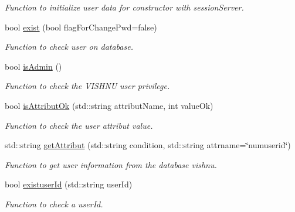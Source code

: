 \begin{DoxyCompactItemize}
\begin{DoxyCompactList}\small\item\em Function to initialize user data for constructor with sessionServer. \item\end{DoxyCompactList}\item 
bool \hyperlink{classUserServer_a26ccae7a3b8ee7e62e2224312119aece}{exist} (bool flagForChangePwd=false)
\begin{DoxyCompactList}\small\item\em Function to check user on database. \item\end{DoxyCompactList}\item 
bool \hyperlink{classUserServer_a7dab9117c2ca5a706bb674e43b183255}{isAdmin} ()
\begin{DoxyCompactList}\small\item\em Function to check the VISHNU user privilege. \item\end{DoxyCompactList}\item 
bool \hyperlink{classUserServer_aecc5dd38cacf2460a187f6e751000c9a}{isAttributOk} (std::string attributName, int valueOk)
\begin{DoxyCompactList}\small\item\em Function to check the user attribut value. \item\end{DoxyCompactList}\item 
std::string \hyperlink{classUserServer_aaabcde0c694987b990a3ba1af445f718}{getAttribut} (std::string condition, std::string attrname=\char`\"{}numuserid\char`\"{})
\begin{DoxyCompactList}\small\item\em Function to get user information from the database vishnu. \item\end{DoxyCompactList}\item 
bool \hyperlink{classUserServer_ac61e9715aa922ad746ecd8f788130834}{existuserId} (std::string userId)
\begin{DoxyCompactList}\small\item\em Function to check a userId. \item\end{DoxyCompactList}\end{DoxyCompactItemize}
